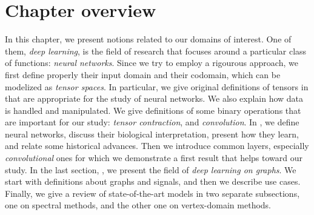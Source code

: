 \section*{Chapter overview}

In this chapter, we present notions related to our domains of interest. One of them, \emph{deep learning}, is the field of research that focuses around a particular class of functions: \emph{neural networks}. Since we try to employ a rigourous approach, we first define properly their input domain and their codomain, which can be modelized as \emph{tensor spaces}. In particular, we give original definitions of tensors in  that are appropriate for the study of neural networks. We also explain how data is handled and manipulated. We give definitions of some binary operations that are important for our study: \emph{tensor contraction}, and \emph{convolution}. In , we define neural networks, discuss their biological interpretation, present how they learn, and relate some historical advances. Then we introduce common layers, especially \emph{convolutional} ones for which we demonstrate a first result that helps toward our study. In the last section, , we present the field of \emph{deep learning on graphs}. We start with definitions about graphs and signals, and then we describe use cases. Finally, we give a review of state-of-the-art models in two separate subsections, one on spectral methods, and the other one on vertex-domain methods.